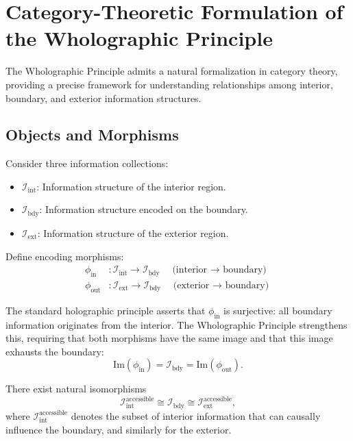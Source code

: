 ﻿\documentclass[12pt]{article}
\begin{document}
\appendix


\section{Category-Theoretic Formulation of the Wholographic Principle}


The Wholographic Principle admits a natural formalization in category theory, providing a precise framework for understanding relationships among interior, boundary, and exterior information structures.


\subsection{Objects and Morphisms}


Consider three information collections:


\begin{itemize}
    \item $\mathcal{I}_{\mathrm{int}}$: Information structure of the interior region.
    \item $\mathcal{I}_{\mathrm{bdy}}$: Information structure encoded on the boundary.
    \item $\mathcal{I}_{\mathrm{ext}}$: Information structure of the exterior region.
\end{itemize}


Define encoding morphisms:
\begin{align*}
    \phi_{\mathrm{in}} &: \mathcal{I}_{\mathrm{int}} \to \mathcal{I}_{\mathrm{bdy}} \quad \text{(interior $\to$ boundary)} \\
    \phi_{\mathrm{out}} &: \mathcal{I}_{\mathrm{ext}} \to \mathcal{I}_{\mathrm{bdy}} \quad \text{(exterior $\to$ boundary)}
\end{align*}


The standard holographic principle asserts that $\phi_{\mathrm{in}}$ is surjective: all boundary information originates from the interior. The Wholographic Principle strengthens this, requiring that both morphisms have the same image and that this image exhausts the boundary:
\[
\mathrm{Im}(\phi_{\mathrm{in}}) = \mathcal{I}_{\mathrm{bdy}} = \mathrm{Im}(\phi_{\mathrm{out}}).
\]


There exist natural isomorphisms
\[
\mathcal{I}_{\mathrm{int}}^{\mathrm{accessible}} \cong \mathcal{I}_{\mathrm{bdy}} \cong \mathcal{I}_{\mathrm{ext}}^{\mathrm{accessible}},
\]
where $\mathcal{I}_{\mathrm{int}}^{\mathrm{accessible}}$ denotes the subset of interior information that can causally influence the boundary, and similarly for the exterior.
\end{document}
